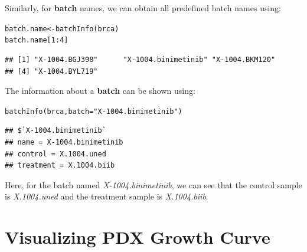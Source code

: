 \documentclass{article}\usepackage[]{graphicx}\usepackage[usenames,dvipsnames]{color}
\newcommand{\hlnum}[1]{\textcolor[rgb]{0.816,0.125,0.439}{#1}}%
\newcommand{\hlstr}[1]{\textcolor[rgb]{0.251,0.627,0.251}{#1}}%
\newcommand{\hlopt}[1]{\textcolor[rgb]{0,0,0}{#1}}%
\newcommand{\hlstd}[1]{\textcolor[rgb]{0.251,0.251,0.251}{#1}}%
\newcommand{\hlkwb}[1]{\textcolor[rgb]{0,0,0}{#1}}%
\newcommand{\hlkwc}[1]{\textcolor[rgb]{0.251,0.251,0.251}{#1}}%
\newcommand{\hlkwd}[1]{\textcolor[rgb]{0.878,0.439,0.125}{#1}}%
\newenvironment{knitrout}{}{} %
\begin{document}
Similarly, for \textbf{batch} names, we can obtain all predefined batch names using:

\begin{knitrout}
\color{fgcolor}\begin{kframe}
\begin{alltt}
\hlstd{batch.name} \hlkwb{<-} \hlkwd{batchInfo}\hlstd{(brca)}
\hlstd{batch.name[}\hlnum{1}\hlopt{:}\hlnum{4}\hlstd{]}
\end{alltt}
\begin{verbatim}
## [1] "X-1004.BGJ398"      "X-1004.binimetinib" "X-1004.BKM120"     
## [4] "X-1004.BYL719"
\end{verbatim}
\end{kframe}
\end{knitrout}

The information about a \textbf{batch} can be shown using:
\begin{knitrout}
\color{fgcolor}\begin{kframe}
\begin{alltt}
\hlkwd{batchInfo}\hlstd{(brca,} \hlkwc{batch} \hlstd{=} \hlstr{"X-1004.binimetinib"}\hlstd{)}
\end{alltt}
\begin{verbatim}
## $`X-1004.binimetinib`
## name = X-1004.binimetinib
## control = X.1004.uned
## treatment = X.1004.biib
\end{verbatim}
\end{kframe}
\end{knitrout}
Here, for the batch named \textit{X-1004.binimetinib}, we can see that the control sample is \textit{X.1004.uned} and the treatment sample is \textit{X.1004.biib}.



\section{Visualizing PDX Growth Curve}
\end{document}

